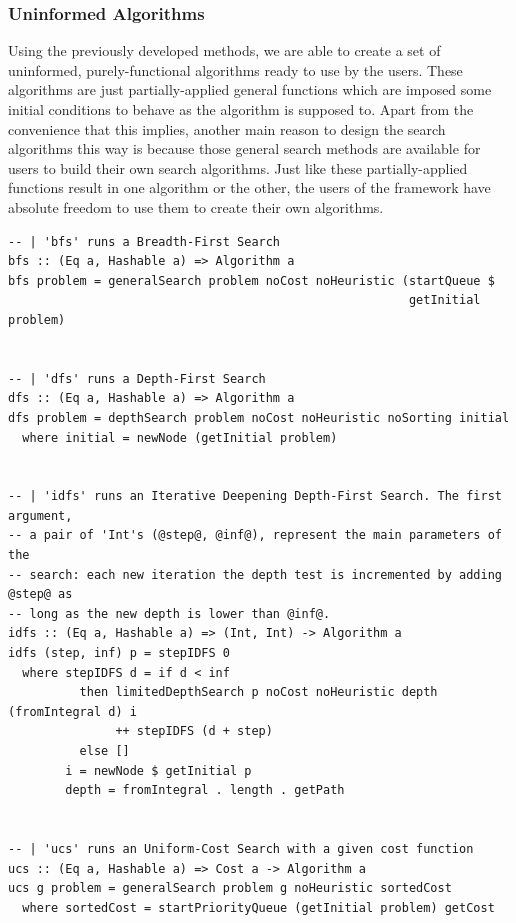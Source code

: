 \subsubsection{Uninformed Algorithms}

Using the previously developed methods, we are able to create a set of
uninformed, purely-functional algorithms ready to use by the users. These
algorithms are just partially-applied general functions which are imposed some
initial conditions to behave as the algorithm is supposed to. Apart from the
convenience that this implies, another main reason to design the search
algorithms this way is because those general search methods are available for
users to build their own search algorithms. Just like these partially-applied
functions result in one algorithm or the other, the users of the framework have
absolute freedom to use them to create their own algorithms.\\

\begin{lstlisting}[style=haskell,
caption=Pure uninformed search algorithms, label=pure:uninf]
-- | 'bfs' runs a Breadth-First Search
bfs :: (Eq a, Hashable a) => Algorithm a
bfs problem = generalSearch problem noCost noHeuristic (startQueue $
                                                        getInitial problem)


-- | 'dfs' runs a Depth-First Search
dfs :: (Eq a, Hashable a) => Algorithm a
dfs problem = depthSearch problem noCost noHeuristic noSorting initial
  where initial = newNode (getInitial problem)


-- | 'idfs' runs an Iterative Deepening Depth-First Search. The first argument,
-- a pair of 'Int's (@step@, @inf@), represent the main parameters of the
-- search: each new iteration the depth test is incremented by adding @step@ as
-- long as the new depth is lower than @inf@.
idfs :: (Eq a, Hashable a) => (Int, Int) -> Algorithm a
idfs (step, inf) p = stepIDFS 0
  where stepIDFS d = if d < inf
          then limitedDepthSearch p noCost noHeuristic depth (fromIntegral d) i
               ++ stepIDFS (d + step)
          else []
        i = newNode $ getInitial p
        depth = fromIntegral . length . getPath


-- | 'ucs' runs an Uniform-Cost Search with a given cost function
ucs :: (Eq a, Hashable a) => Cost a -> Algorithm a
ucs g problem = generalSearch problem g noHeuristic sortedCost
  where sortedCost = startPriorityQueue (getInitial problem) getCost
\end{lstlisting}

